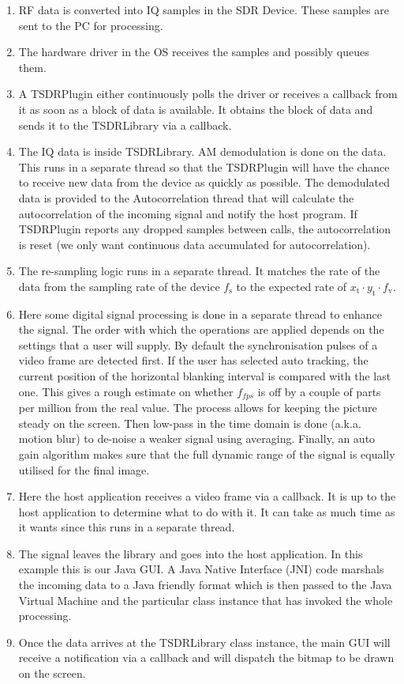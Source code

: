 \documentclass[a4paper,12pt,twoside,openright]{report}
\begin{document}
\begin{enumerate}
	\item RF data is converted into IQ samples in the SDR Device. These samples are sent to the PC for processing.
	\item The hardware driver in the OS receives the samples and possibly queues them.
	\item A TSDRPlugin either continuously polls the driver or receives a callback from it as soon as a block of data is available. It obtains the block of data and sends it to the TSDRLibrary via a callback.
	\item The IQ data is inside TSDRLibrary. AM demodulation is done on the data. This runs in a separate thread so that the TSDRPlugin will have the chance to receive new data from the device as quickly as possible. The demodulated data is provided to the Autocorrelation thread that will calculate the autocorrelation of the incoming signal and notify the host program. If TSDRPlugin reports any dropped samples between calls, the autocorrelation is reset (we only want continuous data accumulated for autocorrelation).
	\item The re-sampling logic runs in a separate thread. It matches the rate of the data from the sampling rate of the device $f_\text{s}$ to the expected rate of $x_\text{t} \cdot y_\text{t} \cdot f_\text{v}$.
	\item Here some digital signal processing is done in a separate thread to enhance the signal. The order with which the operations are applied depends on the settings that a user will supply. By default the synchronisation pulses of a video frame are detected first. If the user has selected auto tracking, the current position of the horizontal blanking interval is compared with the last one. This gives a rough estimate on whether $f_{fps}$ is off by a couple of parts per million from the real value. The process allows for keeping the picture steady on the screen. Then low-pass in the time domain is done (a.k.a. motion blur) to de-noise a weaker signal using averaging. Finally, an auto gain algorithm makes sure that the full dynamic range of the signal is equally utilised for the final image.
	\item Here the host application receives a video frame via a callback. It is up to the host application to determine what to do with it. It can take as much time as it wants since this runs in a separate thread.
	\item The signal leaves the library and goes into the host application. In this example this is our Java GUI. A Java Native Interface (JNI) code marshals the incoming data to a Java friendly format which is then passed to the Java Virtual Machine and the particular class instance that has invoked the whole processing.
	\item Once the data arrives at the TSDRLibrary class instance, the main GUI will receive a notification via a callback and will dispatch the bitmap to be drawn on the screen.
\end{enumerate}
\end{document}
